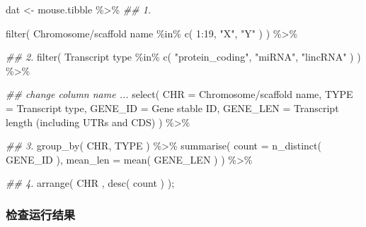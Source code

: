 \documentclass[
]{article}
\newenvironment{Shaded}{}{}
\newcommand{\AttributeTok}[1]{\textcolor[rgb]{0.49,0.56,0.16}{#1}}
\newcommand{\DecValTok}[1]{\textcolor[rgb]{0.25,0.63,0.44}{#1}}
\newcommand{\DocumentationTok}[1]{\textcolor[rgb]{0.73,0.13,0.13}{\textit{#1}}}
\newcommand{\FunctionTok}[1]{\textcolor[rgb]{0.02,0.16,0.49}{#1}}
\newcommand{\NormalTok}[1]{#1}
\newcommand{\OtherTok}[1]{\textcolor[rgb]{0.00,0.44,0.13}{#1}}
\newcommand{\SpecialCharTok}[1]{\textcolor[rgb]{0.25,0.44,0.63}{#1}}
\newcommand{\StringTok}[1]{\textcolor[rgb]{0.25,0.44,0.63}{#1}}
\begin{document}
\begin{Shaded}
\begin{Highlighting}[]
\NormalTok{dat }\OtherTok{\textless{}{-}}\NormalTok{ mouse.tibble }\SpecialCharTok{\%\textgreater{}\%} 
  \DocumentationTok{\#\# 1. }
  
  \FunctionTok{filter}\NormalTok{( }\StringTok{\textasciigrave{}}\AttributeTok{Chromosome/scaffold name}\StringTok{\textasciigrave{}} \SpecialCharTok{\%in\%} \FunctionTok{c}\NormalTok{( }\DecValTok{1}\SpecialCharTok{:}\DecValTok{19}\NormalTok{, }\StringTok{"X"}\NormalTok{, }\StringTok{"Y"}\NormalTok{ )   ) }\SpecialCharTok{\%\textgreater{}\%} 
  
  \DocumentationTok{\#\# 2. }
  \FunctionTok{filter}\NormalTok{( }\StringTok{\textasciigrave{}}\AttributeTok{Transcript type}\StringTok{\textasciigrave{}} \SpecialCharTok{\%in\%} \FunctionTok{c}\NormalTok{( }\StringTok{"protein\_coding"}\NormalTok{, }\StringTok{"miRNA"}\NormalTok{, }\StringTok{"lincRNA"}\NormalTok{ ) ) }\SpecialCharTok{\%\textgreater{}\%}
  
  \DocumentationTok{\#\# change column name ... }
  \FunctionTok{select}\NormalTok{( }\AttributeTok{CHR =} \StringTok{\textasciigrave{}}\AttributeTok{Chromosome/scaffold name}\StringTok{\textasciigrave{}}\NormalTok{, }\AttributeTok{TYPE =} \StringTok{\textasciigrave{}}\AttributeTok{Transcript type}\StringTok{\textasciigrave{}}\NormalTok{, }
          \AttributeTok{GENE\_ID =} \StringTok{\textasciigrave{}}\AttributeTok{Gene stable ID}\StringTok{\textasciigrave{}}\NormalTok{, }
          \AttributeTok{GENE\_LEN =}  \StringTok{\textasciigrave{}}\AttributeTok{Transcript length (including UTRs and CDS)}\StringTok{\textasciigrave{}}\NormalTok{  ) }\SpecialCharTok{\%\textgreater{}\%}
  
  \DocumentationTok{\#\# 3. }
  \FunctionTok{group\_by}\NormalTok{( CHR, TYPE ) }\SpecialCharTok{\%\textgreater{}\%} 
  \FunctionTok{summarise}\NormalTok{( }\AttributeTok{count =} \FunctionTok{n\_distinct}\NormalTok{( GENE\_ID ), }\AttributeTok{mean\_len =} \FunctionTok{mean}\NormalTok{( GENE\_LEN ) ) }\SpecialCharTok{\%\textgreater{}\%} 
  
  \DocumentationTok{\#\# 4. }
  \FunctionTok{arrange}\NormalTok{(  CHR  , }\FunctionTok{desc}\NormalTok{( count ) );}
\end{Highlighting}
\end{Shaded}

\hypertarget{ux68c0ux67e5ux8fd0ux884cux7ed3ux679c}{%
\subsubsection{检查运行结果}\label{ux68c0ux67e5ux8fd0ux884cux7ed3ux679c}}
\end{document}
